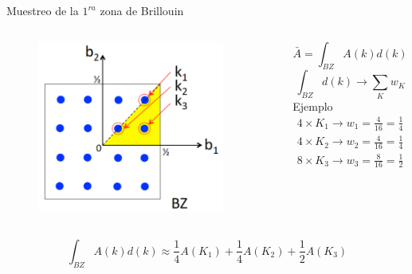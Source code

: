 \begin{frame}{Muestreo de la $1^{ra}$ zona de Brillouin}
\begin{columns}[t]
    \begin{figure}[H]
        \centering
        \includegraphics[width=0.9\textwidth]{contenido/teoria/img_teoria/ZonaBrillouin.png}
    \end{figure}
   \[ 
   \bar{A} = \int _{BZ} A(k) d(k)
   \]
   \[
   \int _{BZ} d(k) \to \sum _{K} w_{K}
   \]
   Ejemplo
   \begin{eqnarray}
   4 \times K_{1} \to w_{1} = \frac{4}{16} = \frac{1}{4} \nonumber \\
   4 \times K_{2} \to w_{2} = \frac{4}{16} = \frac{1}{4} \nonumber \\
   8 \times K_{3} \to w_{3} = \frac{8}{16} = \frac{1}{2} \nonumber
   \end{eqnarray}
\end{columns}
\[
\int _{BZ} A(k) d(k) \approx \frac{1}{4}A(K_{1}) + \frac{1}{4}A(K_{2}) + \frac{1}{2}A(K_{3})
\]
\end{frame}